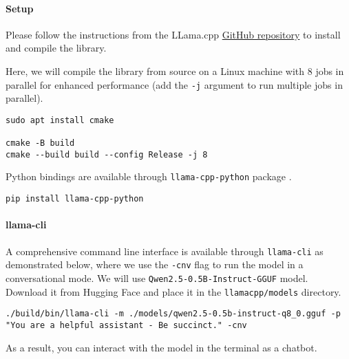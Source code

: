 \paragraph{Setup}

Please follow the instructions from the LLama.cpp \href{https://github.com/ggerganov/llama.cpp}{GitHub repository}  to install and compile the library.

Here, we will compile the library from source on a Linux machine with 8 jobs in parallel for enhanced performance (add the \texttt{-j} argument to run multiple jobs in parallel). 

\begin{verbatim}
sudo apt install cmake

cmake -B build
cmake --build build --config Release -j 8
\end{verbatim}

Python bindings are available through \texttt{llama-cpp-python} package .

\begin{verbatim}
pip install llama-cpp-python
\end{verbatim}

\paragraph{llama-cli}

A comprehensive command line interface is available through \texttt{llama-cli} as demonstrated below, where we use the \texttt{-cnv} flag to run the model in a conversational mode. We will use \texttt{Qwen2.5-0.5B-Instruct-GGUF} model. Download it from Hugging Face and place it in the \texttt{llamacpp/models} directory.

\begin{verbatim}
./build/bin/llama-cli -m ./models/qwen2.5-0.5b-instruct-q8_0.gguf -p "You are a helpful assistant - Be succinct." -cnv
\end{verbatim}

As a result, you can interact with the model in the terminal as a chatbot.

